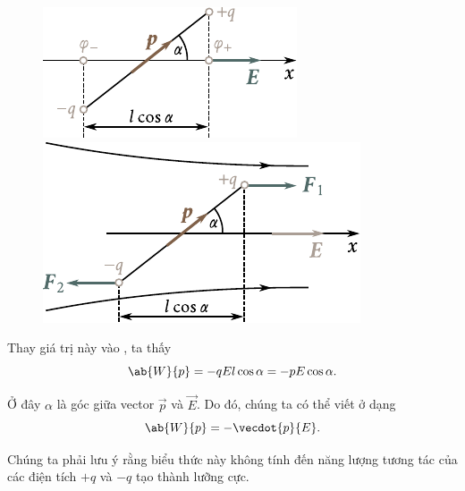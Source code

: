 \begin{figure}[!htb]
	\begin{minipage}[t]{0.5\linewidth}
		\begin{center}
			\includegraphics[scale=1]{figures/ch_01/fig_1_13.pdf}
			\caption[]{}
			\label{fig:1_13}
		\end{center}
	\end{minipage}
	\hspace{-0.05cm}
	\begin{minipage}[t]{0.5\linewidth}
		\begin{center}
			\includegraphics[scale=1]{figures/ch_01/fig_1_14.pdf}
			\caption[]{}
			\label{fig:1_14}
		\end{center}
	\end{minipage}
\vspace{-0.4cm}
\end{figure}

\noindent
Thay giá trị này vào , ta thấy
\begin{equation}\label{eq:1_60}
	\ab{W}{p} = - q E l \cos\alpha = - p E \cos\alpha.
\end{equation}

\noindent
Ở đây $\alpha$ là góc giữa vector $\vec{p}$ và $\vec{E}$. Do đó, chúng ta có thể viết  ở dạng
\begin{equation}\label{eq:1_61}
	\ab{W}{p} = - \vecdot{p}{E}.
\end{equation}

\noindent
Chúng ta phải lưu ý rằng biểu thức này không tính đến năng lượng tương tác của các điện tích $+q$ và $-q$ tạo thành lưỡng cực.

